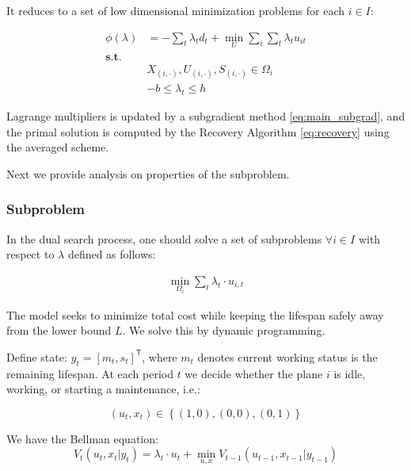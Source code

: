 \documentclass[../main]{subfiles}
\begin{document}
It reduces to a set of low dimensional minimization problems for each \(i \in I\):

\begin{equation}\label{eq:fmp.dual_phi}
  \begin{aligned}
    \phi(\lambda)   & = - \sum_t \lambda_t d_t  + \min_{U}\sum_i \sum_t\lambda_t u_{it} \\
    \mathbf {s.t. } &                                                                   \\
                    & X_{(i,\cdot)}, U_{(i,\cdot)}, S_{(i,\cdot)} \in \Omega_i          \\
                    & -b \le \lambda_t \le h
  \end{aligned}
\end{equation}


Lagrange multipliers is updated by a subgradient method \eqref{eq:main_subgrad}, and the primal solution is computed by the Recovery Algorithm \eqref{eq:recovery} using the averaged scheme.

Next we provide analysis on properties of the subproblem.

\subsubsection{Subproblem}\label{sec:fmp.subproblem-for-each-plane}

In the dual search process, one should solve a set of subproblems
\(\forall i\in I\) with respect to \(\lambda\) defined as follows:

\begin{equation}\begin{aligned}
    \min_{\Omega_i} \sum_t \lambda_t \cdot u_{i,t}
  \end{aligned}\end{equation}

The model seeks to minimize total cost while keeping the
lifespan safely away from the lower bound \(L\). We solve this by
dynamic programming.

Define state: \(y_t = \left[m_t,s_t \right]^\mathsf{T}\), where \(m_t\)
denotes current working status is the remaining lifespan.
At each period \(t\) we decide whether the plane \(i\) is idle, working, or starting a maintenance, i.e.:

\[(u_t, x_t) \in \left\{(1, 0), (0,0), (0, 1)\right\}\]

We have the Bellman equation:
\begin{equation}\label{eq:fmp.dp.deterministic}
  V_t(u_t, x_t | y_t) = \lambda_t \cdot u_t + \min_{u,x} V_{t-1}(u_{t-1}, x_{t-1} | y_{t-1})
\end{equation}
\end{document}
